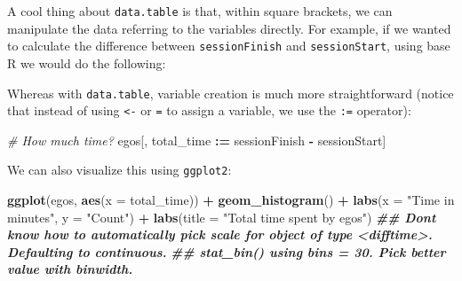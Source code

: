 \documentclass[
]{book}
\newenvironment{Shaded}{\begin{snugshade}}{\end{snugshade}}
\newcommand{\AttributeTok}[1]{\textcolor[rgb]{0.13,0.29,0.53}{#1}}
\newcommand{\CommentTok}[1]{\textcolor[rgb]{0.56,0.35,0.01}{\textit{#1}}}
\newcommand{\DocumentationTok}[1]{\textcolor[rgb]{0.56,0.35,0.01}{\textbf{\textit{#1}}}}
\newcommand{\FunctionTok}[1]{\textcolor[rgb]{0.13,0.29,0.53}{\textbf{#1}}}
\newcommand{\NormalTok}[1]{#1}
\newcommand{\OtherTok}[1]{\textcolor[rgb]{0.56,0.35,0.01}{#1}}
\newcommand{\SpecialCharTok}[1]{\textcolor[rgb]{0.81,0.36,0.00}{\textbf{#1}}}
\newcommand{\StringTok}[1]{\textcolor[rgb]{0.31,0.60,0.02}{#1}}
\begin{document}
A cool thing about \texttt{data.table} is that, within square brackets, we can manipulate the data referring to the variables directly. For example, if we wanted to calculate the difference between \texttt{sessionFinish} and \texttt{sessionStart}, using base R we would do the following:

\begin{Shaded}
\end{Shaded}

Whereas with \texttt{data.table}, variable creation is much more straightforward (notice that instead of using \texttt{\textless{}-} or \texttt{=} to assign a variable, we use the \texttt{:=} operator):

\begin{Shaded}
\begin{Highlighting}[]
\CommentTok{\# How much time?}
\NormalTok{egos[, total\_time }\SpecialCharTok{:=}\NormalTok{ sessionFinish }\SpecialCharTok{{-}}\NormalTok{ sessionStart]}
\end{Highlighting}
\end{Shaded}

We can also visualize this using \texttt{ggplot2}:

\begin{Shaded}
\begin{Highlighting}[]
\FunctionTok{ggplot}\NormalTok{(egos, }\FunctionTok{aes}\NormalTok{(}\AttributeTok{x =}\NormalTok{ total\_time)) }\SpecialCharTok{+}
  \FunctionTok{geom\_histogram}\NormalTok{() }\SpecialCharTok{+}
  \FunctionTok{labs}\NormalTok{(}\AttributeTok{x =} \StringTok{"Time in minutes"}\NormalTok{, }\AttributeTok{y =} \StringTok{"Count"}\NormalTok{) }\SpecialCharTok{+}
  \FunctionTok{labs}\NormalTok{(}\AttributeTok{title =} \StringTok{"Total time spent by egos"}\NormalTok{)}
\DocumentationTok{\#\# Don\textquotesingle{}t know how to automatically pick scale for object of type \textless{}difftime\textgreater{}. Defaulting to continuous.}
\DocumentationTok{\#\# \textasciigrave{}stat\_bin()\textasciigrave{} using \textasciigrave{}bins = 30\textasciigrave{}. Pick better value with \textasciigrave{}binwidth\textasciigrave{}.}
\end{Highlighting}
\end{Shaded}
\end{document}
